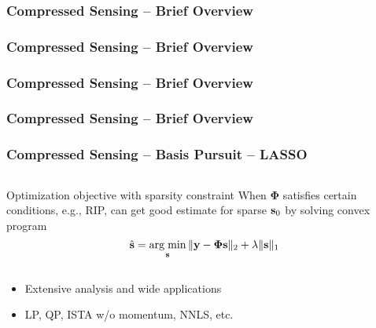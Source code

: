 
\begin{frame} \frametitle{Compressed Sensing -- Brief Overview}
\begin{center}  \end{center}
\end{frame}


\begin{frame} \frametitle{Compressed Sensing -- Brief Overview}
\begin{center}  \end{center}
\end{frame}


\begin{frame} \frametitle{Compressed Sensing -- Brief Overview}
\begin{center}  \end{center}
\end{frame}


\begin{frame} \frametitle{Compressed Sensing -- Brief Overview}
\begin{center}  \end{center}
\end{frame}


\begin{frame}
\frametitle{Compressed Sensing -- Basis Pursuit -- LASSO}
\hfill
\scalebox{0.5}{}
\vspace{-1cm}

\begin{columns}
\begin{block}{Optimization objective with sparsity constraint}
When $\boldsymbol{\Phi}$ satisfies certain conditions, e.g., RIP, can get good estimate for sparse $\mathbf{s}_0$ by solving convex program
\begin{equation*}
\hat{\mathbf{s}} = \operatorname*{arg \; min}_{\mathbf{s}} 
\| \mathbf{y} - \boldsymbol{\Phi} \mathbf{s} \|_2 + \lambda \| \mathbf{s} \|_1
\end{equation*}
\end{block}
\end{columns}
\vfill
\begin{itemize}
\item Extensive analysis and wide applications 
\item LP, QP, ISTA w/o momentum, NNLS, etc.
\end{itemize}
\end{frame}

